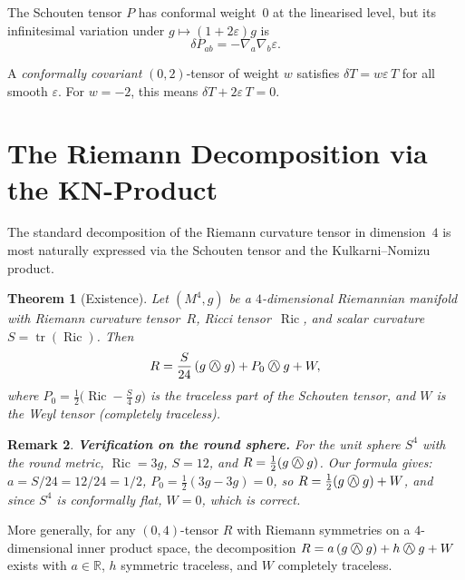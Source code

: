 \documentclass[11pt,a4paper]{article}
\newcommand{\owedge}{\mathbin{%
  \text{%
    \ooalign{%
      \hfil$\wedge$\hfil\cr
      \hfil\raisebox{0.05em}{$\bigcirc$}\hfil\cr
    }%
  }%
}}
\newtheorem{theorem}{Theorem}[section]
\newtheorem{remark}[theorem]{Remark}
\begin{document}
The Schouten tensor $P$ has conformal weight~$0$ at the linearised level,
but its infinitesimal variation under
$g \mapsto (1+2\varepsilon)g$ is
\begin{equation}
  \label{eq:deltaP}
  \delta P_{ab} = -\nabla_a \nabla_b \varepsilon.
\end{equation}

A \emph{conformally covariant} $(0,2)$-tensor of weight $w$ satisfies
$\delta T = w\varepsilon\, T$ for all smooth $\varepsilon$. For $w=-2$,
this means $\delta T + 2\varepsilon\, T = 0$.

\section{The Riemann Decomposition via the KN-Product}
\label{sec:decomp}

The standard decomposition of the Riemann curvature tensor in dimension~$4$
is most naturally expressed via the Schouten tensor and the
Kulkarni--Nomizu product.

\begin{theorem}[Existence]
\label{thm:decomp_exist}
Let $(M^4, g)$ be a $4$-dimensional Riemannian manifold with Riemann
curvature tensor~$R$, Ricci tensor~$\operatorname{Ric}$, and scalar
curvature $S = \operatorname{tr}(\operatorname{Ric})$.
Then
\[
  R = \frac{S}{24}\,(g \owedge g) + P_0 \owedge g + W,
\]
where $P_0 = \frac{1}{2}\bigl(\operatorname{Ric} - \frac{S}{4}\,g\bigr)$
is the traceless part of the Schouten tensor, and $W$ is the Weyl tensor
(completely traceless).
\end{theorem}

\begin{remark}
\textbf{Verification on the round sphere.}
For the unit sphere $S^4$ with the round metric, $\operatorname{Ric} = 3g$,
$S = 12$, and $R = \frac{1}{2}(g \owedge g)$.
Our formula gives: $a = S/24 = 12/24 = 1/2$, $P_0 = \frac{1}{2}(3g - 3g) = 0$,
so $R = \frac{1}{2}(g \owedge g) + W$, and since $S^4$ is conformally flat,
$W = 0$, which is correct.
\end{remark}

More generally, for any $(0,4)$-tensor $R$ with Riemann symmetries on a
$4$-dimensional inner product space, the decomposition
$R = a\,(g \owedge g) + h \owedge g + W$
exists with $a \in \mathbb{R}$, $h$ symmetric traceless, and $W$ completely
traceless.
\end{document}
